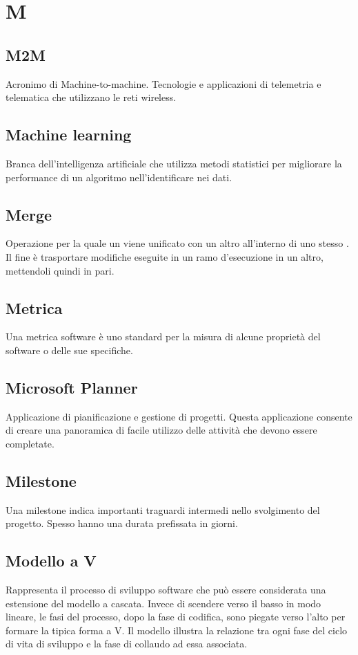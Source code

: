 \section*{M}
\markright{}

\subsection*{M2M}
Acronimo di Machine-to-machine. Tecnologie e applicazioni di telemetria e telematica che utilizzano le reti wireless.

\subsection*{Machine learning}
Branca dell'intelligenza artificiale che utilizza metodi statistici per migliorare la performance di un algoritmo nell'identificare  nei dati.

\subsection*{Merge}
Operazione per la quale un  viene unificato con un altro all'interno di uno stesso . Il fine è trasportare modifiche eseguite in un ramo d'esecuzione in un altro, mettendoli quindi in pari.

\subsection*{Metrica}
Una metrica software è uno standard per la misura di alcune proprietà del software o delle sue specifiche.

\subsection*{Microsoft Planner}
Applicazione di pianificazione e gestione di progetti. Questa applicazione consente di creare una panoramica di facile utilizzo delle attività che devono essere completate.

\subsection*{Milestone}
Una milestone indica importanti traguardi intermedi nello svolgimento del progetto. Spesso hanno una durata prefissata in giorni.

\subsection*{Modello a V}
Rappresenta il processo di sviluppo software che può essere considerata una estensione del modello a cascata. Invece di scendere verso il basso in modo lineare, le fasi del processo, dopo la fase di codifica, sono piegate verso l'alto per formare la tipica forma a V. Il modello illustra la relazione tra ogni fase del ciclo di vita di sviluppo e la fase di collaudo ad essa associata.


